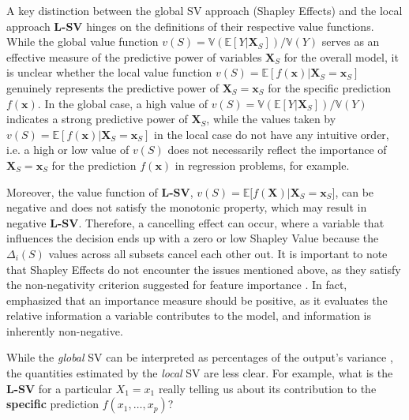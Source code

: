 \documentclass{article}
\newcommand\XS{\boldsymbol{X}_S}
\newcommand\X{\boldsymbol{X}}
\newcommand\xs{\boldsymbol{x}_S}
\newcommand\x{\boldsymbol{x}}
\theoremstyle{plain}
\theoremstyle{definition}
\theoremstyle{remark}
\newcommand{\lsv}{\textcolor{lsv}{\textbf{L-SV}}}
\begin{document}
A key distinction between the global SV approach (Shapley Effects) and the local approach \lsv{}  hinges on the definitions of their respective value functions. While the global value function $v(S) = \mathbb{V}(\mathbb{E}[Y \vert \XS])/\mathbb{V}(Y)$ serves as an effective measure of the predictive power of variables $\XS$ for the overall model, it is unclear whether the local value function $v(S) = \mathbb{E}[f(\x) | \XS=\xs]$ genuinely represents the predictive power of $\XS=\xs$ for the specific prediction $f(\x)$. In the global case, a high value of $v(S) = \mathbb{V}(\mathbb{E}[Y \vert \XS])/\mathbb{V}(Y)$ indicates a strong predictive power of $\XS$, while the values taken by $v(S) = \mathbb{E}[f(\x) | \XS=\xs]$ in the local case do not have any intuitive order, i.e. a high or low value of $v(S)$ does not necessarily reflect the importance of $\XS=\xs$ for the prediction $f(\x)$ in regression problems, for example.




Moreover, the value function of \lsv{}, $v(S) = \mathbb{E}\big[ f(\X) \vert \XS = \xs\big]$, can be negative and does not satisfy the monotonic property, which may result in negative \lsv{}. Therefore, a cancelling effect can occur, where a variable that influences the decision ends up with a zero or low Shapley Value because the $\Delta_i(S)$ values across all subsets cancel each other out. It is important to note that Shapley Effects do not encounter the issues mentioned above, as they satisfy the non-negativity criterion suggested for feature importance \citep{johnson2004history, gromping2007estimators, feldman2005relative}. In fact, \cite{feldman2005relative} emphasized that an importance measure should be positive, as it evaluates the relative information a variable contributes to the model, and information is inherently non-negative.

While the \textit{global} SV can be interpreted as percentages of the output’s variance \citep{idrissi2024development}, the quantities estimated by the \textit{local} SV are less clear. For example, what is the \lsv{} for a particular $X_1 = x_1$ really telling us about its contribution to the \textbf{specific} prediction $f(x_1, \dots, x_p)$?
\end{document}
